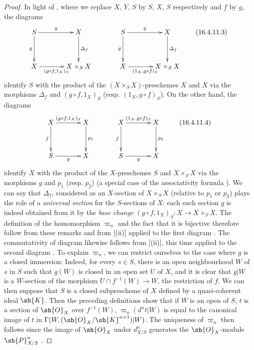 \begin{proof}
In light of , where we replace $X$, $Y$, $S$ by $S$, $X$, $S$ respectively and $f$ by $g$, the diagrams
\[
  \label{IV.16.4.11.3}
  \xymatrix@=3pc{
    S \ar[r]^-g \ar[d]_-g &  X \ar[d]^-{\Delta_f} & S \ar[r]^-g  \ar[d]_-g & X \ar[d]^-{\Delta_f}  \\
    X \ar[r]_{(g\circ f, 1_X)_S} & X\times_S X & X \ar[r]_{(1_X, g\circ f)_S} & X \times_S X
  }
  \tag{16.4.11.3}
\]
identify $S$ with the product of the $(X \times_S X)$-preschemes $X$ and $X$ via the morphisms $\Delta_f$ and $(g\circ f, 1_X)_S$ (resp. $(1_X, g\circ f)_S$).
On the other hand, the diagrams
\[
  \label{IV.16.4.11.4}
  \xymatrix@=3pc{
    X \ar[r]^{(g\circ f, 1_X)_S} \ar[d]_-f &  X \ar[d]^-{p_1} &  X \ar[r]^{(1_X, g\circ f)_S} \ar[d]_-f &  X \ar[d]^-{p_2} \\
    S \ar[r]_{g} & X & S \ar[r]_{g} & X
  }
  \tag{16.4.11.4}
\]
identify $X$ with the product of the $X$-preschemes $S$ and $X \times_S X$ via the morphisms $g$ and $p_1$ (resp. $p_2$) (a special case of the associativity formula ).
We can say that $\Delta_f$, considered as an $X$-section of $X \times_S X$ (relative to $p_1$ or $p_2$) plays the role of a \emph{universal section} for the $S$-sections of $X$:
each such section $g$ is indeed obtained from it by the \emph{base change} $(g \circ f, 1_X)_S: X \to X \times_S X$.
The definition of the homomorphism $\varpi_n$ and the fact that it is bijective therefore follow from these remarks and from [(ii)] applied to the first diagram .
The commutativity of diagram  likewise follows from [(ii)], this time applied to the second diagram .
To explain $\varpi_n$, we can restrict ourselves to the case where $g$ is a closed immersion:
Indeed, for every $s \in S$, there is an open neighbourhood $W$ of $s$ in $S$ such that $g(W)$ is closed in an open set $U$ of $X$, and it is clear that $g|W$ is a $W$-section of the morphism $U \cap f^{-1}(W) \to W$, the restriction of $f$.
We can then suppose that $S$ is a closed subprescheme of $X$ defined by a quasi-coherent ideal $\sh{K}$.
Then the preceding definitions show that if $W$ is an open of $S$, $t$ is a section of $\sh{O}_X$ over $f^{-1}(W)$, $\varpi_n(d^n t|W)$ is equal to the canonical image of $t$ in $\Gamma(W, (\sh{O}_X/\sh{K}^{n+1})|W)$. 
The uniqueness of $\varpi_n$ then follows since the image of $\sh{O}_X$ under $d_{X/S}^n$ generates the $\sh{O}_X$-module $\sh{P}_{X/S}^n$ .
\end{proof}

